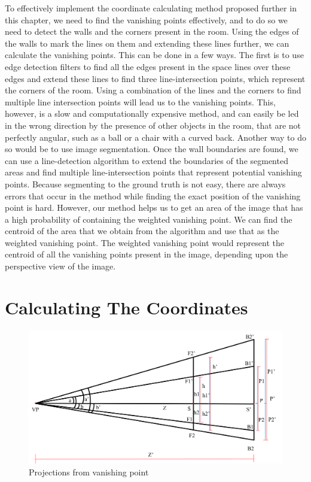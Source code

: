To effectively implement the coordinate calculating method proposed further in this chapter, we need to find the vanishing points effectively, and to do so we need to detect the walls and the corners present in the room. Using the edges of the walls to mark the lines on them and extending these lines further, we can calculate the vanishing points. This can be done in a few ways. The first is to use edge detection filters to find all the edges present in the space lines over these edges and extend these lines to find three line-intersection points, which represent the corners of the room. Using a combination of the lines and the corners to find multiple line intersection points will lead us to the vanishing points. This, however, is a slow and computationally expensive method, and can easily be led in the wrong direction by the presence of other objects in the room, that are not perfectly angular, such as a ball or a chair with a curved back. Another way to do so would be to use image segmentation. Once the wall boundaries are found, we can use a line-detection algorithm to extend the boundaries of the segmented areas and find multiple line-intersection points that represent potential vanishing points. Because segmenting to the ground truth is not easy, there are always errors that occur in the method while finding the exact position of the vanishing point is hard. However, our method helps us to get an area of the image that has a high probability of containing the weighted vanishing point. We can find the centroid of the area that we obtain from the algorithm and use that as the weighted vanishing point. The weighted vanishing point would represent the centroid of all the vanishing points present in the image, depending upon the perspective view of the image.

\section{Calculating The Coordinates}


\begin{figure}[H]
    \centering
    \includegraphics[width=1.0\textwidth]{Calculations1.jpeg}
    \caption{Projections from vanishing point}
    \label{fig: Projections from vanishing point}
\end{figure}

